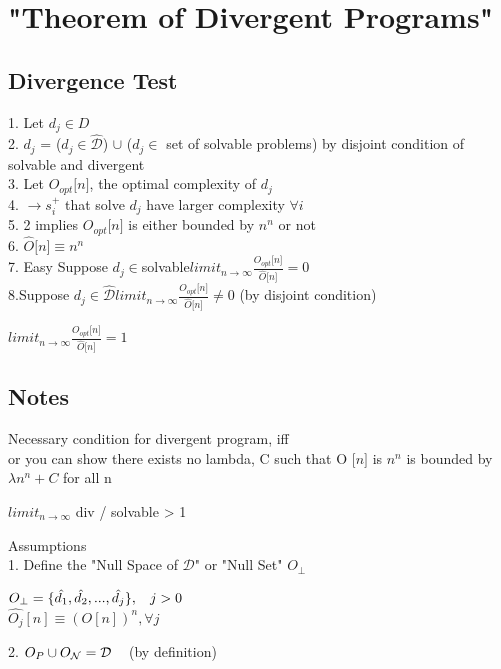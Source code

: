 \documentclass[11pt]{article}
\begin{document}
\newpage

\section{"Theorem of Divergent Programs"}
\subsection{Divergence Test}
1. Let $d_j \in D$\\
2. $d_j$ = ($d_j \in \hat{\mathcal{D}}$) $\cup$ ($d_j \in$ set of solvable problems) by disjoint condition of solvable and divergent\\
3. Let $O_{opt}\lbrack n \rbrack$, the optimal complexity of $d_j$\\
4. $\rightarrow s_i^{+}$ that solve $d_j$ have larger complexity $\forall i$\\
5. 2 implies  $O_{opt}\lbrack n \rbrack$ is either bounded by $n^n$ or not\\
6. $\hat{O} \lbrack n \rbrack \equiv n^n$\\
7. Easy Suppose $d_j\in $solvable$ limit_{n \rightarrow \infty}\frac{O_{opt}\lbrack n \rbrack}{\hat{O}\lbrack n \rbrack} = 0 $\\
8.Suppose $d_j\in \hat{\mathcal{D}} limit_{n \rightarrow \infty}\frac{O_{opt}\lbrack n \rbrack}{\hat{O}\lbrack n \rbrack} \neq 0 $ (by disjoint condition)\\
\begin{center}
$
 limit_{n \rightarrow \infty}\frac{O_{opt}\lbrack n \rbrack}{\hat{O}\lbrack n \rbrack} = 1 
$

\end{center}








\newpage
\subsection{Notes}
Necessary condition for divergent program, iff\\
 or you can show there exists no lambda, C such that O $\lbrack n \rbrack$ is $n^n$ is bounded by $\lambda n^n + C$ for all n

$limit_{n \rightarrow \infty}$ div / solvable > 1

Assumptions\\
1. Define the "Null Space of $\mathcal{D}$" or "Null Set" $O_\perp$
\begin{center}
$
O_\perp = \{\hat{d_1},\hat{d_2},...,\hat{d_j}\}, \hspace{3mm} j > 0
$
\\
$
 \hat{O_j} [n] \equiv (O[n])^n, \forall j
$
\end{center}
2. $O_P \cup O_\mathcal{N} =\mathcal{D} \hspace{3mm}$ (by definition)\\
\end{document}
